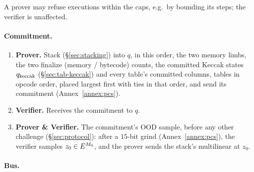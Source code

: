 A prover may refuse executions within the caps, e.g.\ by bounding its steps; the verifier is unaffected.

\paragraph{Commitment.}

\begin{enumerate}
\item \textbf{Prover.} Stack (\S\ref{sec:stacking}) into $q$, in this order, the two memory limbs, the two finalize (memory / bytecode) counts, the committed Keccak states $q_{\mathrm{keccak}}$ (\S\ref{sec:tab-keccak}) and every table's committed columns, tables in opcode order, placed largest first with ties in that order, and send its commitment (Annex~\ref{annex:pcs}).
\item \textbf{Verifier.} Receives the commitment to $q$.
\item \textbf{Prover \& Verifier.} The commitment's OOD sample, before any other challenge (\S\ref{sec:protocol}): after a $15$-bit grind (Annex~\ref{annex:pcs}), the verifier samples $z_0\in E^{M_0}$, and the prover sends the stack's multilinear at $z_0$.
\end{enumerate}

\paragraph{Bus.}

